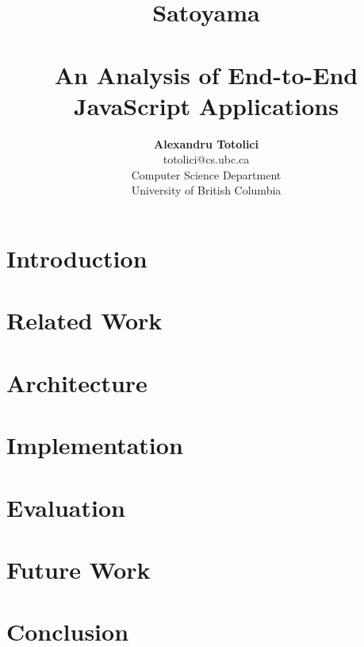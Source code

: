 \documentclass[letterpaper,twocolumn,10pt,final]{article}
\begin{document}
\date{}

\title{\selectfont
    {\huge{\textbf{Satoyama}}}\\
    {\large{\textbf{\\An Analysis of End-to-End JavaScript Applications}}}}


\author{
{\rm \textbf{Alexandru Totolici}}\\
{\rm totolici@cs.ubc.ca}\\
Computer Science Department\\
University of British Columbia\\
} %

\maketitle

\thispagestyle{empty}

\begin{abstract}
\end{abstract}

\section{\label{sec:intro}Introduction}
\section{\label{sec:relwork}Related Work}
\section{\label{sec:arch}Architecture}
\section{\label{sec:impl}Implementation}
\section{\label{sec:eval}Evaluation}
\section{\label{sec:fw}Future Work}
\section{\label{sec:con}Conclusion}
\end{document}
